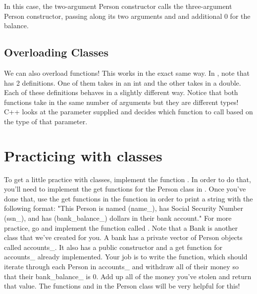 \documentclass{tufte-handout}
\begin{document}
\noindent In this case, the two-argument Person constructor calls the
three-argument Person constructor, passing along its two arguments and
and additional 0 for the balance.

\subsection{Overloading Classes}
We can also overload functions! This works in the exact same way.
In , note that  has 2 definitions. 
One of them takes in an int and the other takes in a double.
Each of these definitions behaves in a slightly different way.
Notice that both functions take in the same number of arguments but they are different types!
C++ looks at the parameter supplied and decides which function to call based on the type of that parameter.

\section{Practicing with classes}

To get a little practice with classes, implement the function . In order to do that, you'll need to implement the get functions for the Person class in . Once you've done that, use the get functions in the  function in order to print a string with the following format: \newline
\medskip
\noindent "This Person is named (name\_), has Social Security Number (ssn\_), 
and has (bank\_balance\_) dollars in their bank account." \newline
\medskip
\noindent For more practice, go  and implement the function called . Note that a Bank is another class that we've created for you.
A bank has a private vector of Person objects called accounts\_. It also has a public constructor and a get function for accounts\_ already implemented. 
Your job is to write the  function, which should iterate through each Person in accounts\_ and withdraw all of their money so that their bank\_balance\_ is 0. Add up all of the money you've stolen and return that value. The functions  and  in the Person class will be very helpful for this!
\end{document}
